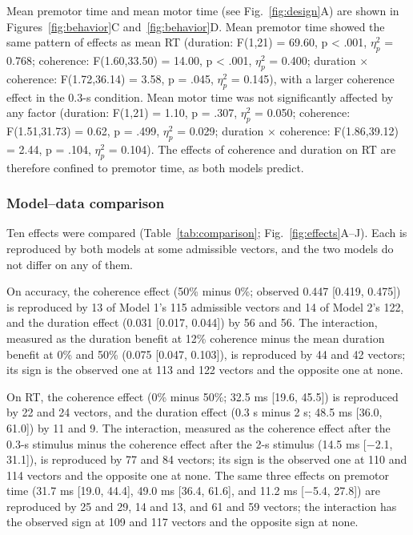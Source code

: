 \documentclass[a4paper,11pt]{article}
\theoremstyle{definition}
\newcommand{\1}{\mathbbm{1}}
\begin{document}
Mean premotor time and mean motor time (see Fig.~\ref{fig:design}A) are shown in Figures~\ref{fig:behavior}C and~\ref{fig:behavior}D. Mean premotor time showed the same pattern of effects as mean RT (duration: F(1,21) = 69.60, p < .001, $\eta_{p}^{2}$ = 0.768; coherence: F(1.60,33.50) = 14.00, p < .001, $\eta_{p}^{2}$ = 0.400; duration $\times$ coherence: F(1.72,36.14) = 3.58, p = .045, $\eta_{p}^{2}$ = 0.145), with a larger coherence effect in the 0.3-s condition. Mean motor time was not significantly affected by any factor (duration: F(1,21) = 1.10, p = .307, $\eta_{p}^{2}$ = 0.050; coherence: F(1.51,31.73) = 0.62, p = .499, $\eta_{p}^{2}$ = 0.029; duration $\times$ coherence: F(1.86,39.12) = 2.44, p = .104, $\eta_{p}^{2}$ = 0.104). The effects of coherence and duration on RT are therefore confined to premotor time, as both models predict.


\subsubsection{Model--data comparison}

Ten effects were compared (Table~\ref{tab:comparison}; Fig.~\ref{fig:effects}A--J). Each is reproduced by both models at some admissible vectors, and the two models do not differ on any of them.

On accuracy, the coherence effect (50\% minus 0\%; observed 0.447 [0.419, 0.475]) is reproduced by 13 of Model 1's 115 admissible vectors and 14 of Model 2's 122, and the duration effect (0.031 [0.017, 0.044]) by 56 and 56. The interaction, measured as the duration benefit at 12\% coherence minus the mean duration benefit at 0\% and 50\% (0.075 [0.047, 0.103]), is reproduced by 44 and 42 vectors; its sign is the observed one at 113 and 122 vectors and the opposite one at none.

On RT, the coherence effect (0\% minus 50\%; 32.5 ms [19.6, 45.5]) is reproduced by 22 and 24 vectors, and the duration effect (0.3 s minus 2 s; 48.5 ms [36.0, 61.0]) by 11 and 9. The interaction, measured as the coherence effect after the 0.3-s stimulus minus the coherence effect after the 2-s stimulus (14.5 ms [$-$2.1, 31.1]), is reproduced by 77 and 84 vectors; its sign is the observed one at 110 and 114 vectors and the opposite one at none. The same three effects on premotor time (31.7 ms [19.0, 44.4], 49.0 ms [36.4, 61.6], and 11.2 ms [$-$5.4, 27.8]) are reproduced by 25 and 29, 14 and 13, and 61 and 59 vectors; the interaction has the observed sign at 109 and 117 vectors and the opposite sign at none.
\end{document}
